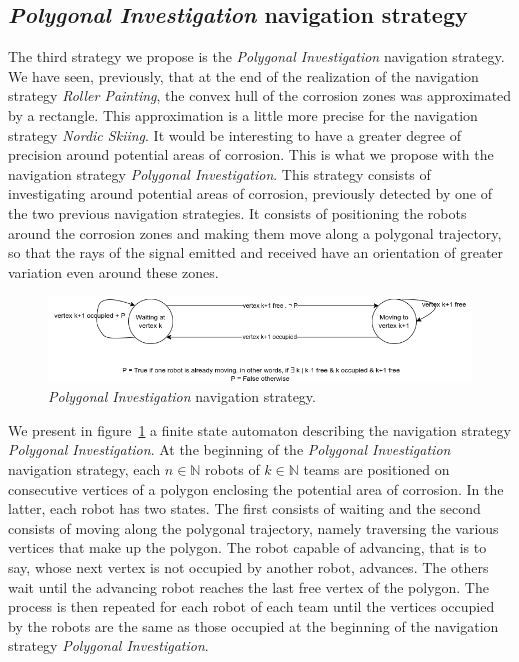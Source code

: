\subsection*{\textit{Polygonal Investigation} navigation strategy}

The third strategy we propose is the \textit{Polygonal Investigation} navigation strategy.
We have seen, previously, that at the end of the realization of the navigation strategy \textit{Roller Painting}, the convex hull of the corrosion zones was approximated by a rectangle.
This approximation is a little more precise for the navigation strategy \textit{Nordic Skiing}.
It would be interesting to have a greater degree of precision around potential areas of corrosion.
This is what we propose with the navigation strategy \textit{Polygonal Investigation}.
This strategy consists of investigating around potential areas of corrosion, previously detected by one of the two previous navigation strategies.
It consists of positioning the robots around the corrosion zones and making them move along a polygonal trajectory, so that the rays of the signal emitted and received have an orientation of greater variation even around these zones.

\begin{figure}[h!]
	\centering
	\includegraphics[scale=0.6]{graphics/automat_poly.png}
	\caption{\textit{Polygonal Investigation} navigation strategy.}
	\label{fig:automat}
\end{figure}

We present in figure~\ref{fig:automat} a finite state automaton describing the navigation strategy \textit{Polygonal Investigation}.
At the beginning of the \textit{Polygonal Investigation} navigation strategy, each $n \in \mathbb{N}$ robots of $k \in \mathbb{N}$ teams are positioned on consecutive vertices of a polygon enclosing the potential area of corrosion.
In the latter, each robot has two states.
The first consists of waiting and the second consists of moving along the polygonal trajectory, namely traversing the various vertices that make up the polygon.
The robot capable of advancing, that is to say, whose next vertex is not occupied by another robot, advances.
The others wait until the advancing robot reaches the last free vertex of the polygon.
The process is then repeated for each robot of each team until the vertices occupied by the robots are the same as those occupied at the beginning of the navigation strategy \textit{Polygonal Investigation}.

